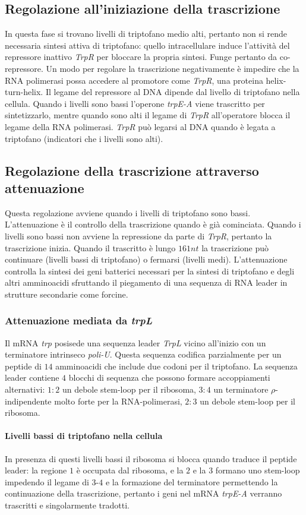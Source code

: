 \subsection{Regolazione all'iniziazione della trascrizione}
In questa fase si trovano livelli di triptofano medio alti, pertanto non si rende necessaria sintesi attiva di triptofano: quello intracellulare induce l'attivit\`a del repressore
inattivo \emph{TrpR} per bloccare la propria sintesi. Funge pertanto da co-repressore. Un modo per regolare la trascrizione negativamente \`e impedire che la RNA polimerasi possa
accedere al promotore come \emph{TrpR}, una proteina helix-turn-helix. Il legame del repressore al DNA dipende dal livello di triptofano nella cellula. Quando i livelli sono bassi 
l'operone \emph{trpE-A} viene trascritto per sintetizzarlo, mentre quando sono alti il legame di \emph{TrpR} all'operatore blocca il legame della RNA polimerasi. \emph{TrpR} pu\`o 
legarsi al DNA quando \`e legata a triptofano (indicatori che i livelli sono alti). 
\subsection{Regolazione della trascrizione attraverso attenuazione}
Questa regolazione avviene quando i livelli di triptofano sono bassi. L'attenuazione \`e il controllo della trascrizione quando \`e gi\`a cominciata. Quando i livelli sono bassi non
avviene la repressione da parte di \emph{TrpR}, pertanto la trascrizione inizia. Quando il trascritto \`e lungo $161nt$ la trascrizione pu\`o continuare (livelli bassi di triptofano) o 
fermarsi (livelli medi). L'attenuazione controlla la sintesi dei geni batterici necessari per la sintesi di triptofano e degli altri amminoacidi sfruttando il piegamento di una sequenza
di RNA leader in strutture secondarie come forcine. 
\subsubsection{Attenuazione mediata da \emph{trpL}}
Il mRNA \emph{trp} posisede una sequenza leader \emph{TrpL} vicino all'inizio con un terminatore intrinseco \emph{poli-U}. Questa sequenza codifica parzialmente per un peptide di $14$
amminoacidi che include due codoni per il triptofano. La sequenza leader contiene $4$ blocchi di sequenza che possono formare accoppiamenti alternativi: $1:2$ un debole stem-loop per
il ribosoma, $3:4$ un terminatore $\rho$-indipendente molto forte per la RNA-polimerasi, $2:3$ un debole stem-loop per il ribosoma. 
\paragraph{Livelli bassi di triptofano nella cellula}
In presenza di questi livelli bassi il ribosoma si blocca quando traduce il peptide leader: la regione $1$ \`e occupata dal ribosoma, e la $2$ e la $3$ formano uno stem-loop impedendo
il legame di $3$-$4$ e la formazione del terminatore permettendo la continuazione della trascrizione, pertanto i geni nel mRNA \emph{trpE-A} verranno trascritti e singolarmente tradotti.
